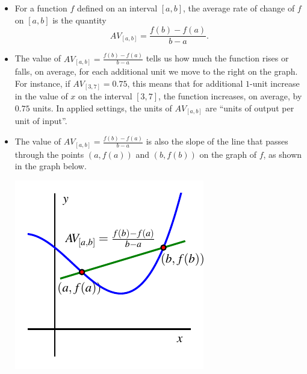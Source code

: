 \documentclass[nooutcomes]{ximera}
\begin{document}
\begin{exploration}
\begin{enumerate}[label=\alph*.]
\end{enumerate}
\end{exploration}

\begin{summary}\begin{itemize}
\item For a function $f$ defined on an interval $[a,b]$, the average rate of change of $f$ on $[a,b]$ is the quantity%
\begin{equation*}
AV_{[a,b]} = \frac{f(b) - f(a)}{b-a}\text{.}
\end{equation*}
\item The value of $AV_{[a,b]} = \frac{f(b) - f(a)}{b-a}$ tells us how much the function rises or falls, on average, for each additional unit we move to the right on the graph.  For instance, if $AV_{[3,7]} = 0.75$, this means that for additional $1$-unit increase in the value of $x$ on the interval $[3,7]$, the function increases, on average, by $0.75$ units.  In applied settings, the units of $AV_{[a,b]}$ are ``units of output per unit of input''.
\item The value of $AV_{[a,b]} = \frac{f(b) - f(a)}{b-a}$ is also the slope of the line that passes through the points $(a,f(a))$ and $(b,f(b))$ on the graph of $f$, as shown in the graph below.
\begin{image}
\includegraphics{aroc-f-x-defn.pdf}
\end{image}

\end{itemize}\end{summary}
\end{document}
